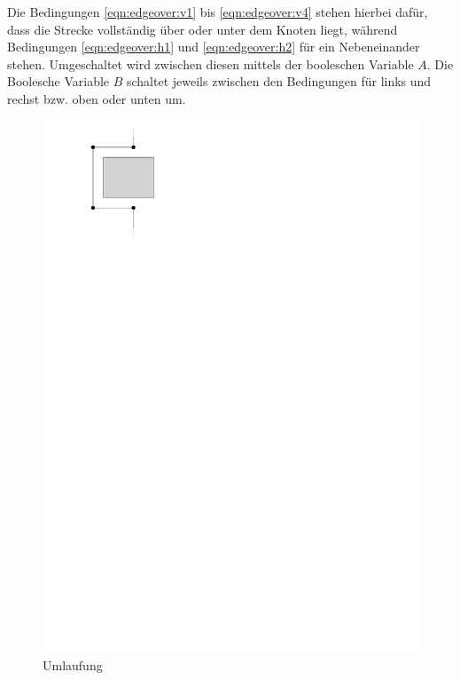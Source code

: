 Die Bedingungen \ref{eqn:edgeover:v1} bis \ref{eqn:edgeover:v4} stehen hierbei dafür, dass die Strecke vollständig über oder unter dem Knoten liegt, während Bedingungen \ref{eqn:edgeover:h1} und \ref{eqn:edgeover:h2} für ein Nebeneinander stehen. Umgeschaltet wird zwischen diesen mittels der booleschen Variable $A$. Die Boolesche Variable $B$ schaltet jeweils zwischen den Bedingungen für links und rechst bzw. oben oder unten um.


\begin{figure}
\centering
\begin{minipage}{.2\textwidth}
  \centering
	\includegraphics[width=.8\linewidth]{figures/umlauf.pdf}
	\caption{Umlaufung}
	\label{fig:goaround}
\end{minipage}%
\begin{minipage}{.8\textwidth}
  \centering

\end{minipage}
\end{figure}
